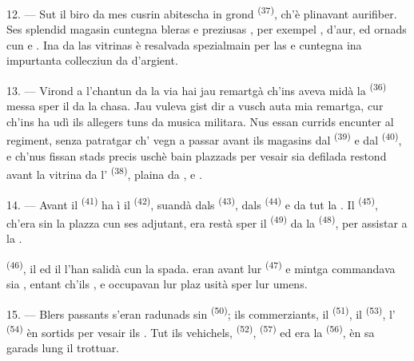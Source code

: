 12. --- Sut il biro da mes cusrin abitescha in grond 
\textsuperscript{(37)}, ch'è plinavant aurifiber. Ses splendid magasin cuntegna bleras
 e preziusas ,
per exempel ,  d'aur,  ed
 ornads cun  e . Ina da las
vitrinas è resalvada spezialmain per las  e cuntegna ina impurtanta
collecziun da  d'argient.

13. --- Virond a l'chantun da la via hai jau remartgà ch'ins aveva midà la
 \textsuperscript{(36)} messa sper il  da la chasa. Jau vuleva gist
dir a vusch auta mia remartga, cur ch'ins ha udì ils allegers tuns da 
musica militara. Nus essan currids encunter al regiment, senza patratgar ch'
vegn a passar avant ils magasins dal  \textsuperscript{(39)} e dal
 \textsuperscript{(40)}, e ch'nus fissan stads precis uschè bain plazzads per
vesair sia defilada restond avant la vitrina da l'
\textsuperscript{(38)}, plaina da ,  e
.

\VUsaut{3.0mm}

14. --- Avant il  \textsuperscript{(41)} ha ì il 
\textsuperscript{(42)}, suandà dals  \textsuperscript{(43)}, dals
 \textsuperscript{(44)} e da tut la . Il 
\textsuperscript{(45)}, ch'era sin la plazza cun ses adjutant, era restà sper il
 \textsuperscript{(49)} da la  \textsuperscript{(48)}, per
assistar a la .

 \textsuperscript{(46)}, il  ed il
 l'han salidà cun la spada.  eran avant lur
 \textsuperscript{(47)} e mintga  commandava sia
, entant ch'ils ,  e
 occupavan lur plaz usità sper lur umens.

15. --- Blers passants s'eran radunads sin 
\textsuperscript{(50)}; ils commerziants, il  \textsuperscript{(51)}, il
 \textsuperscript{(53)}, l' \textsuperscript{(54)} èn sortids per
vesair ils . Tut ils vehichels,  \textsuperscript{(52)},
 \textsuperscript{(57)} ed era la 
\textsuperscript{(56)}, èn sa garads lung il trottuar.

